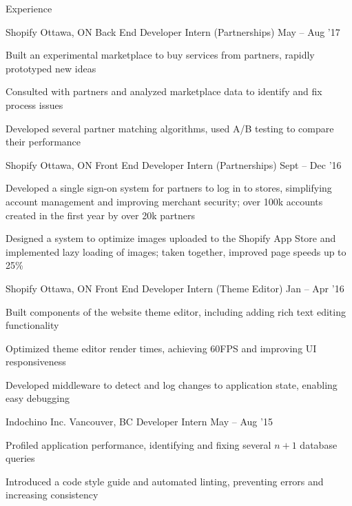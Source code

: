 \documentclass{resume} %
\begin{document}
\begin{rSection}{Experience}
  \begin{rSubsection}{Shopify}
                     {Ottawa, ON}
                     {Back End Developer Intern (Partnerships)}
                     {May -- Aug '17}
    \item Built an experimental marketplace to buy services from partners, rapidly prototyped new ideas
    \item Consulted with partners and analyzed marketplace data to identify and fix process issues
    \item Developed several partner matching algorithms, used A/B testing to compare their performance
  \end{rSubsection}

  \begin{rSubsection}{Shopify}
                     {Ottawa, ON}
                     {Front End Developer Intern (Partnerships)}
                     {Sept -- Dec '16}
    \item Developed a single sign-on system for partners to log in to stores, simplifying account management and improving merchant security; over 100k accounts created in the first year by over 20k partners
    \item Designed a system to optimize images uploaded to the Shopify App Store and implemented lazy loading of images; taken together, improved page speeds up to 25\%
  \end{rSubsection}

  \begin{rSubsection}{Shopify}
                     {Ottawa, ON}
                     {Front End Developer Intern (Theme Editor)}
                     {Jan -- Apr '16}
    \item Built components of the website theme editor, including adding rich text editing functionality
    \item Optimized theme editor render times, achieving 60FPS and improving UI responsiveness
    \item Developed middleware to detect and log changes to application state, enabling easy debugging
  \end{rSubsection}

  \begin{rSubsection}{Indochino Inc.}
                     {Vancouver, BC}
                     {Developer Intern}
                     {May -- Aug '15}
    \item Profiled application performance, identifying and fixing several $n+1$ database queries
    \item Introduced a code style guide and automated linting, preventing errors and increasing consistency
  \end{rSubsection}


\end{rSection}
\end{document}

